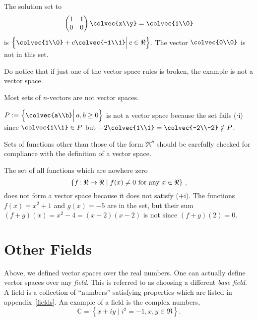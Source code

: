 \begin{example} 
The solution set to 
\[  \begin{pmatrix}
      1 & 1 \\
      0 & 0 
    \end{pmatrix} \colvec{x\\y} = \colvec{1\\0} \]
is  $\left\{ \colvec{1\\0} + c \colvec{-1\\1} \Big|\, c \in \Re \right\}$.
The vector $\colvec{0\\0}$ is not in this set.
\end{example}
Do notice that if just one of the vector space rules is broken, the example is not a vector space.

Most sets of $n$-vectors are not vector spaces. 
\begin{example} 
$P:=\left \{ \colvec{a\\b} \Big| \,a,b \geq 0 \right\}$ is not a vector space because the set fails ($\cdot$i) since 
$\colvec{1\\1}\in P$ but $-2\colvec{1\\1} =\colvec{-2\\-2} \notin P$.
\end{example}


Sets of functions other than those of the form $\Re^S$ should be carefully checked for compliance with the definition of a vector space.


\begin{example}
The set of all functions which are nowhere zero 
\[\left\{ f \colon \Re\rightarrow \Re \mid f(x)\neq 0 {\rm ~for~any}~x\in\Re \right\}\, ,\]
does not form a vector space because it does not satisfy (+i). The functions $f(x)=x^2+1$ and $g(x)= -5$ are in the set, but their sum $(f+g)(x)=x^2-4=(x+2)(x-2)$ is not since $(f+g)(2)=0$.
\end{example}


\section{Other Fields} \label{otherfields}
Above, we defined vector spaces over the real numbers.  One can actually define vector spaces over any \emph{field}.
This is referred to as choosing a different {\it base field}.
  A field is a collection of ``numbers'' satisfying  properties which are listed in appendix~\ref{fields}.
An example of a field is the complex numbers, 
\[
\mathbb{C}= \left\{x+iy \mid i^2=-1, x,y\in \Re \right\}.
\]

